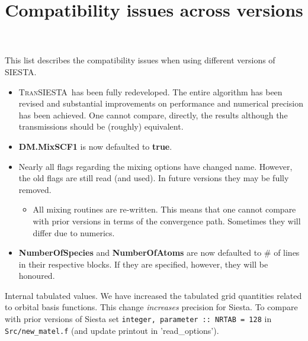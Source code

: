 \documentclass{article}
\title{Compatibility issues across versions}
\author{\siesta}
\newcommand\siesta{\textsc{SIESTA}}
\newcommand\tsiesta{\textsc{TranSIESTA}}
\newcommand{\fdf}[1]{\textbf{#1}}
\begin{document}
\maketitle

\clearpage

This list describes the compatibility issues when using different versions of \siesta.

\begin{description}
  \setlength\itemsep{1pt}
  \setlength\topsep{1pt}

  \item[4.1]%
  \begin{itemize}
    \item %
    \tsiesta\ has been fully redeveloped. The entire algorithm has been revised and
    substantial improvements on performance and numerical precision has been achieved. One
    cannot compare, directly, the results although the transmissions should be (roughly)
    equivalent.

    \item %
    \fdf{DM.MixSCF1} is now defaulted to \fdf{true}.

    \item %
    Nearly all flags regarding the mixing options have changed name. However, the old
    flags are still read (and used). In future versions they may be fully removed.

    \begin{itemize}
      \item All mixing routines are re-written. This means that one cannot compare with
      prior versions in terms of the convergence path. Sometimes they will differ due to numerics.
    \end{itemize}

    \item \fdf{NumberOfSpecies} and \fdf{NumberOfAtoms} are now defaulted to \# of lines
    in their respective blocks. If they are specified, however, they will be honoured.

  \end{itemize}
  

  \item[4.0.2, 4.1] %
  Internal tabulated values. We have increased the tabulated grid quantities related to
  orbital basis functions. This change \emph{increases} precision for Siesta. To compare
  with prior versions of Siesta set \texttt{integer, parameter :: NRTAB = 128} in
  \texttt{Src/new\_matel.f} (and update printout in 'read_options').


\end{description}
\end{document}

